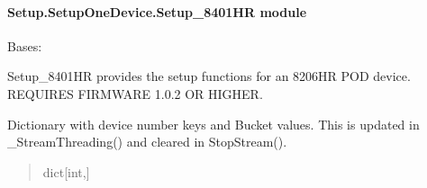 \documentclass[letterpaper,10pt,english]{sphinxmanual}
\begin{document}
\paragraph{Setup.SetupOneDevice.Setup\_8401HR module}
\label{\detokenize{Setup.SetupOneDevice:module-Setup.SetupOneDevice.Setup_8401HR}}\label{\detokenize{Setup.SetupOneDevice:setup-setuponedevice-setup-8401hr-module}}

\begin{fulllineitems}
\label{\detokenize{Setup.SetupOneDevice:Setup.SetupOneDevice.Setup_8401HR.Setup8401HR}}
\pysigstartsignatures
{}
\pysigstopsignatures
\sphinxAtStartPar
Bases: {\hyperref[\detokenize{Setup.SetupOneDevice:Setup.SetupOneDevice.Setup_PodInterface.SetupInterface}]{}}

\sphinxAtStartPar
Setup\_8401HR provides the setup functions for an 8206\sphinxhyphen{}HR POD device.     REQUIRES FIRMWARE 1.0.2 OR HIGHER.

\begin{fulllineitems}
\label{\detokenize{Setup.SetupOneDevice:Setup.SetupOneDevice.Setup_8401HR.Setup8401HR._bucketAccess}}
\pysigstartsignatures
{}
\pysigstopsignatures
\sphinxAtStartPar
Dictionary with device number keys and Bucket values.             This is updated in \_StreamThreading() and cleared in StopStream().
\begin{quote}\begin{description}
\sphinxAtStartPar
dict{[}int,{\hyperref[\detokenize{PodApi.Stream:PodApi.Stream.DataBucket.Bucket}]{}}{]}

\end{description}\end{quote}


\end{fulllineitems}
\end{fulllineitems}
\end{document}
